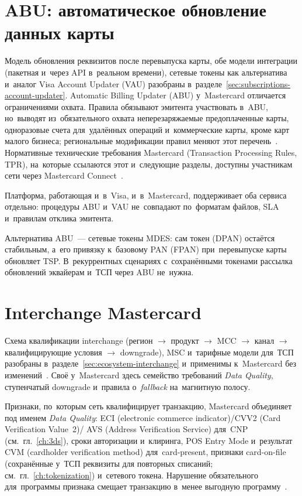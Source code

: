 \section{ABU: автоматическое обновление данных карты}\label{sec:mc-abu}

Модель обновления реквизитов после перевыпуска карты, обе модели
интеграции (пакетная и~через API в~реальном времени), сетевые токены
как альтернатива и~аналог Visa Account Updater (VAU) разобраны
в~разделе~\ref{sec:subscriptions-account-updater}. Automatic Billing Updater
(ABU) у~Mastercard отличается ограничениями охвата. Правила обязывают эмитента
участвовать в~ABU, но~выводят из~обязательного охвата неперезаряжаемые
предоплаченные карты, одноразовые счета для~удалённых операций и~коммерческие
карты, кроме карт малого бизнеса; региональные модификации правил меняют
этот перечень~\cite{mc-abu,mc-tpr}. Нормативные технические требования Mastercard
(Transaction Processing Rules, TPR), на~которые ссылаются этот и~следующие
разделы, доступны участникам сети через Mastercard Connect~\cite{mc-tpr}.

Платформа, работающая и~в~Visa, и~в~Mastercard, поддерживает оба сервиса
отдельно: процедуры ABU и~VAU не~совпадают по~форматам файлов, SLA и~правилам
отклика эмитента.

Альтернатива ABU~--- сетевые токены MDES: сам токен (DPAN) остаётся
стабильным, а~его привязку к~базовому PAN (FPAN) при~перевыпуске карты
обновляет TSP. В~рекуррентных сценариях с~сохранёнными токенами
рассылка обновлений эквайерам и~ТСП через ABU не~нужна.

\section{Interchange Mastercard}\label{sec:mc-interchange}

Схема квалификации interchange (регион $\to$ продукт $\to$ MCC $\to$ канал $\to$
квалифицирующие условия $\to$ downgrade), MSC и~тарифные модели
для~ТСП разобраны в~разделе~\ref{sec:ecosystem-interchange} и~применимы
к~Mastercard без изменений~\cite{mc-interchange-us}. Своё у~Mastercard здесь
семейство требований \emph{Data Quality}, ступенчатый downgrade и~правила
о~\textit{fallback} на~магнитную полосу.

Признаки, по~которым сеть квалифицирует транзакцию, Mastercard объединяет под
именем \emph{Data Quality}: ECI (electronic
commerce indicator)/CVV2 (Card Verification Value~2)/ AVS (Address Verification
Service) для~CNP (см.~гл.~\ref{ch:3ds}), сроки авторизации и~клиринга, POS
Entry Mode и~результат CVM (cardholder verification method) для~card-present,
признаки card-on-file (сохранённые у~ТСП реквизиты для повторных списаний;
см.~гл.~\ref{ch:tokenization}) и~сетевого токена. Нарушение обязательного
для~программы признака смещает транзакцию в~менее выгодную
программу~\cite{mc-interchange-us}.

